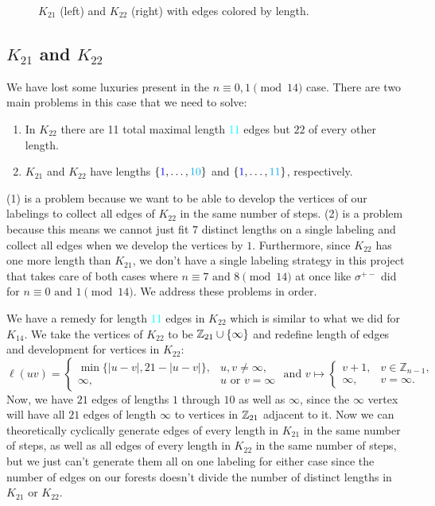 \begin{figure}[H]
\begin{center}
\begin{tikzpicture}[scale=2,
        dot/.style={circle, fill=black, minimum size=2pt, inner sep=0pt},
        lbl/.style={draw=none, fill=none, inner sep=0pt, anchor=center}
      ]
      \end{tikzpicture}
    \end{center}
    \caption{$K_{21}$ (left) and $K_{22}$ (right) with edges colored by length.}
    \label{fig:K21K22colored}
  \end{figure}
  \subsection{$K_{21}$ and $K_{22}$}\label{sec:7,8constrK21K22}
  We have lost some luxuries present in the $n\equiv 0,1\pmod{14}$ case. There are two main problems in this case that we need to solve:
  \begin{enumerate}
    \item In $K_{22}$ there are 11 total maximal length \textcolor{cyan}{11} edges but $22$ of every other length.
    \item $K_{21}$ and $K_{22}$ have lengths $\{\textcolor{blue}{1},\hdots,\textcolor{cyan}{10}\}$ and $\{\textcolor{blue}{1},\hdots,\textcolor{cyan}{11}\}$, respectively.
  \end{enumerate}
  (1) is a problem because we want to be able to develop the vertices of our labelings to collect all edges of $K_{22}$ in the same number of steps. (2) is a problem because this means we cannot just fit $7$ distinct lengths on a single labeling and collect all edges when we develop the vertices by $1$. Furthermore, since $K_{22}$ has one more length than $K_{21}$, we don't have a single labeling strategy in this project that takes care of both cases where $n\equiv 7\text{ and }8\pmod{14}$ at once like $\sigma^{+-}$ did for $n\equiv 0\text{ and }1\pmod{14}$. We address these problems in order.
  
  We have a remedy for length \textcolor{cyan}{11} edges in $K_{22}$ which is similar to what we did for $K_{14}$. We take the vertices of $K_{22}$ to be $\ZZ_{21}\cup\{\infty\}$ and redefine length of edges and development for vertices in $K_{22}$:
  $$\ell(uv)=\begin{cases}\min\{|u-v|,21-|u-v|\}, & u,v\neq \infty, \\ \infty, & u\text{ or }v=\infty \end{cases} \text{ and }v\mapsto 
  \begin{cases}
    v+1,&v\in\mathbb{Z}_{n-1},\\
    \infty,        &v=\infty.
  \end{cases}$$
  Now, we have $21$ edges of lengths $1$ through $10$ as well as $\infty$, since the $\infty$ vertex will have all $21$ edges of length $\infty$ to vertices in $\ZZ_{21}$ adjacent to it. Now we can theoretically cyclically generate edges of every length in $K_{21}$ in the same number of steps, as well as all edges of every length in $K_{22}$ in the same number of steps, but we just can't generate them all on one labeling for either case since the number of edges on our forests doesn't divide the number of distinct lengths in $K_{21}$ or $K_{22}$.

